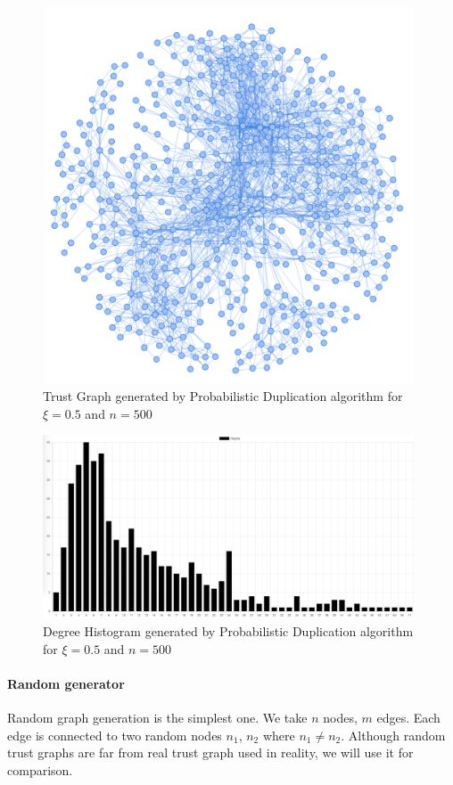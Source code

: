 \begin{figure}[h!]
    \includegraphics[width=11cm]{img/propDup500Graph.png}
    \centering
    \caption{Trust Graph generated by Probabilistic Duplication algorithm for $\xi=0.5$ and $n = 500$}
    \label{fig:propdup500graph}
\end{figure}

\begin{figure}[h!]
    \includegraphics[width=11cm]{img/propDup500Hist.png}
    \centering
    \caption{Degree Histogram generated by Probabilistic Duplication algorithm for $\xi=0.5$ and $n = 500$}
    \label{fig:propdup500histogram}
\end{figure} 

\paragraph{Random generator}
Random graph generation is the simplest one. We take $n$ nodes, $m$ edges. Each edge is connected to two random nodes $n_1$, $n_2$ where $n_1 ≠ n_2$. Although random trust graphs are far from real trust graph used in reality, we will use it for comparison.

